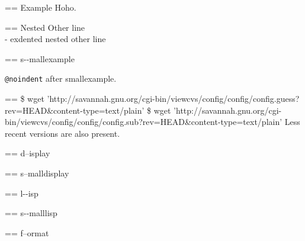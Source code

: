 \documentclass{book}
\makeatletter
\newenvironment{Texinfopreformatted}{%
  \par\GNUTobeylines\obeyspaces\frenchspacing\parskip=\z@\parindent=\z@}{}
{\catcode`\^^M=13 \gdef\GNUTobeylines{\catcode`\^^M=13 \def^^M{\null\par}}}
\newenvironment{Texinfoindented}{\begin{list}{}{}\item\relax}{\end{list}}
\renewcommand{\_}{\Texinfounderscore\discretionary{}{}{}}
\makeatother
\begin{document}
\begin{Texinfoindented}
\begin{Texinfopreformatted}%
\ttfamily Example   Hoho.
\end{Texinfopreformatted}
\begin{Texinfoindented}
\begin{Texinfopreformatted}%
\ttfamily Nested Other line
\end{Texinfopreformatted}
\leavevmode{}\\
\hbox{\kern -\leftmargin}%
exdented nested other line
\\
\end{Texinfoindented}
\end{Texinfoindented}

\begin{Texinfopreformatted}%
\ttfamily \footnotesize s{-}{-}mallexample
\end{Texinfopreformatted}

\texttt{@noindent} after smallexample.
\begin{Texinfopreformatted}%
\ttfamily \footnotesize \$ wget 'http://savannah.gnu.org/cgi-bin/viewcvs/config/config/config.guess?rev=HEAD\&content-type=text/plain'
\$ wget 'http://savannah.gnu.org/cgi-bin/viewcvs/config/config/config.sub?rev=HEAD\&content-type=text/plain'
\end{Texinfopreformatted}
\noindent{}Less recent versions are also present.

\begin{Texinfoindented}
\begin{Texinfopreformatted}%
d--isplay
\end{Texinfopreformatted}
\end{Texinfoindented}

\begin{Texinfopreformatted}%
\footnotesize s--malldisplay
\end{Texinfopreformatted}

\begin{Texinfoindented}
\begin{Texinfopreformatted}%
\ttfamily l{-}{-}isp
\end{Texinfopreformatted}
\end{Texinfoindented}

\begin{Texinfopreformatted}%
\ttfamily \footnotesize s{-}{-}malllisp
\end{Texinfopreformatted}

\begin{Texinfopreformatted}%
f--ormat
\end{Texinfopreformatted}
\end{document}
